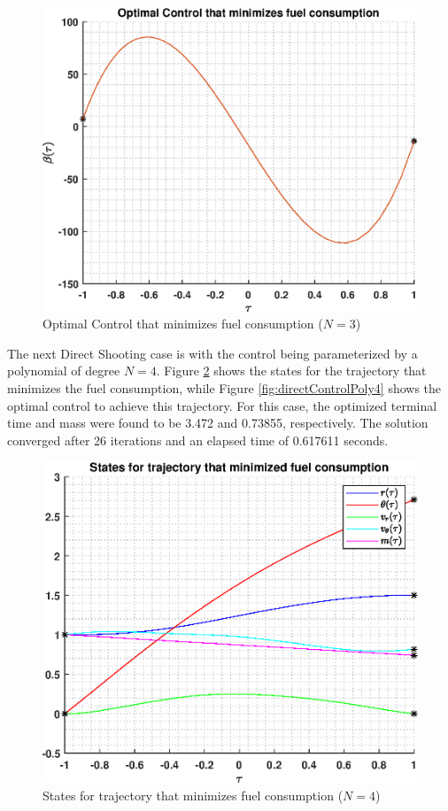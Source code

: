 \documentclass[]{article}
\begin{document}
\begin{figure}
	\centering
	\includegraphics[scale=0.75]{directControlPoly3.eps}
	\caption{Optimal Control that minimizes fuel consumption (\(N = 3\))}
	\label{fig:directControlPoly3}
\end{figure}
\vspace{2mm}\newline 
The next Direct Shooting case is with the control being parameterized by a polynomial of degree \(N = 4\). Figure \ref{fig:directStatesPoly4} shows the states for the trajectory that minimizes the fuel consumption, while Figure \ref{fig:directControlPoly4} shows the optimal control to achieve this trajectory. For this case, the optimized terminal time and mass were found to be 3.472 and 0.73855, respectively. The solution converged after 26 iterations and an elapsed time of 0.617611 seconds.
\begin{figure}
	\centering
	\includegraphics[scale=0.75]{directStatesPoly4.eps}
	\caption{States for trajectory that minimizes fuel consumption (\(N = 4\))}
	\label{fig:directStatesPoly4}
\end{figure}
\end{document}
